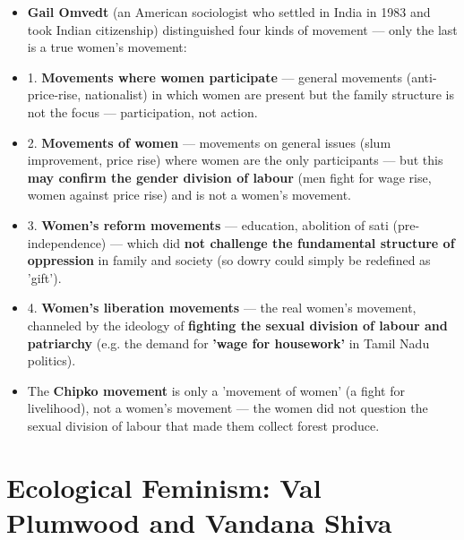 \begin{KeyConcept}
\begin{itemize}
\item \textbf{Gail Omvedt} (an American sociologist who settled in India in 1983 and took Indian citizenship) distinguished four kinds of movement --- only the last is a true women's movement:
\item 1. \textbf{Movements where women participate} --- general movements (anti-price-rise, nationalist) in which women are present but the family structure is not the focus --- participation, not action.
\item 2. \textbf{Movements of women} --- movements on general issues (slum improvement, price rise) where women are the only participants --- but this \textbf{may confirm the gender division of labour} (men fight for wage rise, women against price rise) and is not a women's movement.
\item 3. \textbf{Women's reform movements} --- education, abolition of sati (pre-independence) --- which did \textbf{not challenge the fundamental structure of oppression} in family and society (so dowry could simply be redefined as 'gift').
\item 4. \textbf{Women's liberation movements} --- the real women's movement, channeled by the ideology of \textbf{fighting the sexual division of labour and patriarchy} (e.g. the demand for \textbf{'wage for housework'} in Tamil Nadu politics).
\item The \textbf{Chipko movement} is only a 'movement of women' (a fight for livelihood), not a women's movement --- the women did not question the sexual division of labour that made them collect forest produce.
\end{itemize}
\end{KeyConcept}

\section{Ecological Feminism: Val Plumwood and Vandana Shiva}

